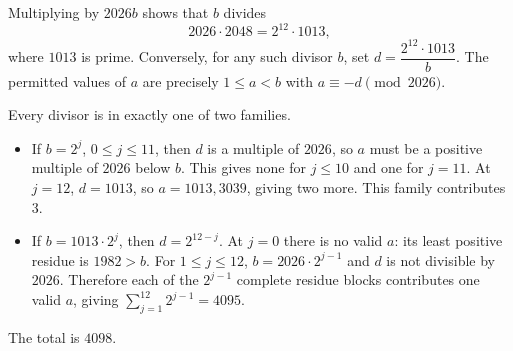 Multiplying by $2026b$ shows that $b$ divides
\[
2026\cdot2048=2^{12}\cdot1013,
\]
where $1013$ is prime. Conversely, for any such divisor $b$, set $d=\dfrac{2^{12}\cdot1013}{b}$. The permitted values of $a$ are precisely $1\le a<b$ with $a\equiv-d\pmod{2026}$.

Every divisor is in exactly one of two families.
\begin{itemize}
\item If $b=2^j$, $0\le j\le11$, then $d$ is a multiple of $2026$, so $a$ must be a positive multiple of $2026$ below $b$. This gives none for $j\le10$ and one for $j=11$. At $j=12$, $d=1013$, so $a=1013,3039$, giving two more. This family contributes $3$.
\item If $b=1013\cdot2^j$, then $d=2^{12-j}$. At $j=0$ there is no valid $a$: its least positive residue is $1982>b$. For $1\le j\le12$, $b=2026\cdot2^{j-1}$ and $d$ is not divisible by $2026$. Therefore each of the $2^{j-1}$ complete residue blocks contributes one valid $a$, giving $\sum_{j=1}^{12}2^{j-1}=4095$.
\end{itemize}
The total is $\boxed{4098}$.
